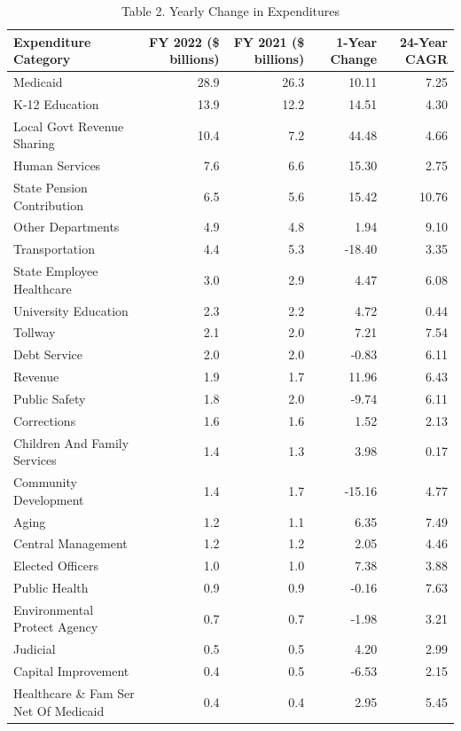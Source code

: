 \documentclass[
  letterpaper,
  DIV=11,
  numbers=noendperiod]{scrreport}
\begin{document}
\begin{table}

\caption{Table 2. Yearly Change in Expenditures}
\centering
\begin{tabular}[t]{l|r|r|r|r}
\hline
Expenditure Category & FY 2022 (\$ billions) & FY 2021 (\$ billions) & 1-Year Change & 24-Year CAGR\\
\hline
Medicaid & 28.9 & 26.3 & 10.11 & 7.25\\
\hline
K-12 Education & 13.9 & 12.2 & 14.51 & 4.30\\
\hline
Local Govt Revenue Sharing & 10.4 & 7.2 & 44.48 & 4.66\\
\hline
Human Services & 7.6 & 6.6 & 15.30 & 2.75\\
\hline
State Pension Contribution & 6.5 & 5.6 & 15.42 & 10.76\\
\hline
Other Departments & 4.9 & 4.8 & 1.94 & 9.10\\
\hline
Transportation & 4.4 & 5.3 & -18.40 & 3.35\\
\hline
State Employee Healthcare & 3.0 & 2.9 & 4.47 & 6.08\\
\hline
University Education & 2.3 & 2.2 & 4.72 & 0.44\\
\hline
Tollway & 2.1 & 2.0 & 7.21 & 7.54\\
\hline
Debt Service & 2.0 & 2.0 & -0.83 & 6.11\\
\hline
Revenue & 1.9 & 1.7 & 11.96 & 6.43\\
\hline
Public Safety & 1.8 & 2.0 & -9.74 & 6.11\\
\hline
Corrections & 1.6 & 1.6 & 1.52 & 2.13\\
\hline
Children And Family Services & 1.4 & 1.3 & 3.98 & 0.17\\
\hline
Community Development & 1.4 & 1.7 & -15.16 & 4.77\\
\hline
Aging & 1.2 & 1.1 & 6.35 & 7.49\\
\hline
Central Management & 1.2 & 1.2 & 2.05 & 4.46\\
\hline
Elected Officers & 1.0 & 1.0 & 7.38 & 3.88\\
\hline
Public Health & 0.9 & 0.9 & -0.16 & 7.63\\
\hline
Environmental Protect Agency & 0.7 & 0.7 & -1.98 & 3.21\\
\hline
Judicial & 0.5 & 0.5 & 4.20 & 2.99\\
\hline
Capital Improvement & 0.4 & 0.5 & -6.53 & 2.15\\
\hline
Healthcare \& Fam Ser Net Of Medicaid & 0.4 & 0.4 & 2.95 & 5.45\\

\end{tabular}
\end{table}
\end{document}
